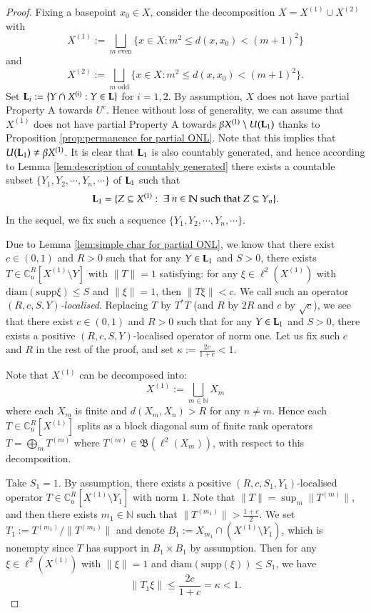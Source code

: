 \documentclass[12pt, a4paper]{amsart}
\numberwithin{equation}{section}
\theoremstyle{definition}
\theoremstyle{remark}
\def\NN{\mathbb{N}}
\def\CC{\mathbb{C}}
\def\L{\mathcal{L}}
\def\B{\mathfrak{B}}
\def\supp{\mathrm{supp}}
\def\diam{\mathrm{diam}}
\def\L{{\bf L}}
\begin{document}
\begin{proof}
Fixing a basepoint $x_0 \in X$, consider the decomposition $X = X^{(1)} \cup X^{(2)}$ with
\[
X^{(1)}:= \bigsqcup_{m \text{ even}} \{x\in X: m^2 \leq d(x, x_0) < (m+1)^2\}\]
and
\[
X^{(2)}:= \bigsqcup_{m \text{ odd}} \{x\in X: m^2 \leq d(x, x_0) < (m+1)^2\}.
\]
Set $\L_i:=\{Y \cap X^{(i)}: Y \in \L\}$ for $i=1,2$. By assumption, $X$ does not have partial Property A towards $U^c$. Hence without loss of generality, we can assume that $X^{(1)}$ does not have partial Property A towards $\beta X^{(1)} \setminus U(\L_1)$ thanks to Proposition \ref{prop:permanence for partial ONL}. Note that this implies that $U(\L_1) \neq \beta X^{(1)}$. 
It is clear that $\L_1$ is also countably generated, and hence according to Lemma \ref{lem:description of countably generated} there exists a countable subset $\{Y_1, Y_2, \cdots, Y_n, \cdots\}$ of $\L_1$ such that 
\[
\L_1=\{Z\subseteq X^{(1)}: ~\exists~n\in \NN \text{ such that } Z \subseteq Y_n\}.
\]
In the sequel, we fix such a sequence $\{Y_1, Y_2, \cdots, Y_n, \cdots\}$.

Due to Lemma \ref{lem:simple char for partial ONL}, we know that there exist $c\in (0,1)$ and $R>0$ such that for any $Y \in \L_1$ and $S>0$, there exists $T \in \CC^R_u[X^{(1)} \setminus Y]$ with $\|T\|=1$ satisfying: for any $\xi \in \ell^2(X^{(1)})$ with $\diam(\supp \xi) \leq S$ and $\|\xi\|=1$, then $\|T \xi\| < c$. We call such an operator \emph{$(R,c,S,Y)$-localised}. Replacing $T$ by $T^*T$ (and $R$ by $2R$ and $c$ by $\sqrt{c}$), we see that there exist $c\in (0,1)$ and $R>0$ such that for any $Y \in \L_1$ and $S>0$, there exists a positive $(R,c,S,Y)$-localised operator  of norm one. Let us fix such $c$ and $R$ in the rest of the proof, and set $\kappa:=\frac{2c}{1+c} < 1$. 

Note that $X^{(1)}$ can be decomposed into:
\[
X^{(1)}:= \bigsqcup_{m\in \NN} X_m
\]
where each $X_m$ is finite and $d(X_m, X_n) > R$ for any $n \neq m$. Hence each $T \in \CC^R_u[X^{(1)}]$ splits as a block diagonal sum of finite rank operators $T = \bigoplus_m T^{(m)}$ where $T^{(m)} \in \B(\ell^2(X_m))$, with respect to this decomposition.

Take $S_1=1$. By assumption, there exists a positive $(R,c,S_1,Y_1)$-localised operator $T \in \CC^R_u[X^{(1)} \setminus Y_1]$ with norm $1$. Note that $\|T\| = \sup_m \|T^{(m)}\|$, and then there exists $m_1 \in \NN$ such that $\|T^{(m_1)}\| > \frac{1+c}{2}$. We set $T_1 := T^{(m_1)} / \|T^{(m_1)}\|$ and denote $B_1:=X_{m_1} \cap (X^{(1)} \setminus Y_1)$, which is nonempty since $T$ has support in $B_1 \times B_1$ by assumption. Then for any $\xi \in \ell^2(X^{(1)})$ with $\|\xi\|=1$ and $\diam(\supp(\xi)) \leq S_1$, we have 
\[
\|T_1 \xi\| \leq \frac{2c}{1+c} = \kappa <1.
\]


\end{proof}
\end{document}
